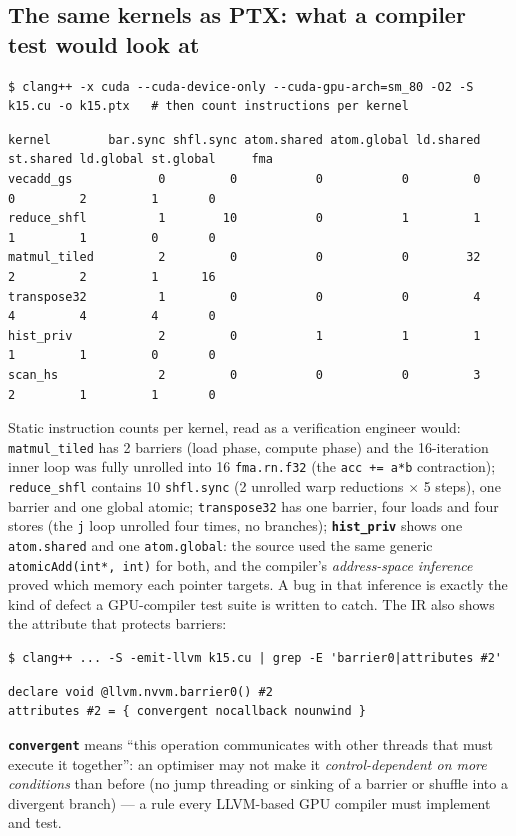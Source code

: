 \documentclass[10pt,a4paper,openany,oneside]{report}
\begin{document}
\subsection{The same kernels as PTX: what a compiler test would look at}
\begin{lstlisting}[style=shcmd,basicstyle=\ttfamily\scriptsize]
$ clang++ -x cuda --cuda-device-only --cuda-gpu-arch=sm_80 -O2 -S k15.cu -o k15.ptx   # then count instructions per kernel
\end{lstlisting}
\begin{lstlisting}[style=out,basicstyle=\ttfamily\scriptsize]
kernel        bar.sync shfl.sync atom.shared atom.global ld.shared st.shared ld.global st.global     fma
vecadd_gs            0         0           0           0         0         0         2         1       0
reduce_shfl          1        10           0           1         1         1         1         0       0
matmul_tiled         2         0           0           0        32         2         2         1      16
transpose32          1         0           0           0         4         4         4         4       0
hist_priv            2         0           1           1         1         1         1         0       0
scan_hs              2         0           0           0         3         2         1         1       0
\end{lstlisting}
Static instruction counts per kernel, read as a verification engineer would: \texttt{matmul\_tiled} has 2 barriers (load phase, compute phase) and the 16-iteration inner loop was fully unrolled into 16 \texttt{fma.rn.f32} (the \texttt{acc += a*b} contraction); \texttt{reduce\_shfl} contains 10 \texttt{shfl.sync} (2 unrolled warp reductions $\times$ 5 steps), one barrier and one global atomic; \texttt{transpose32} has one barrier, four loads and four stores (the \texttt{j} loop unrolled four times, no branches); \textbf{\texttt{hist\_priv}} shows one \texttt{atom.shared} and one \texttt{atom.global}: the source used the same generic \texttt{atomicAdd(int*, int)} for both, and the compiler's \emph{address-space inference} proved which memory each pointer targets. A bug in that inference is exactly the kind of defect a GPU-compiler test suite is written to catch. The IR also shows the attribute that protects barriers:
\begin{lstlisting}[style=shcmd,basicstyle=\ttfamily\scriptsize]
$ clang++ ... -S -emit-llvm k15.cu | grep -E 'barrier0|attributes #2'
\end{lstlisting}
\begin{lstlisting}[language={LLVMIR},style=out,basicstyle=\ttfamily\scriptsize]
declare void @llvm.nvvm.barrier0() #2
attributes #2 = { convergent nocallback nounwind }
\end{lstlisting}
\textbf{\texttt{convergent}} means ``this operation communicates with other threads that must execute it together'': an optimiser may not make it \emph{control-dependent on more conditions} than before (no jump threading or sinking of a barrier or shuffle into a divergent branch) --- a rule every LLVM-based GPU compiler must implement and test.
\end{document}

